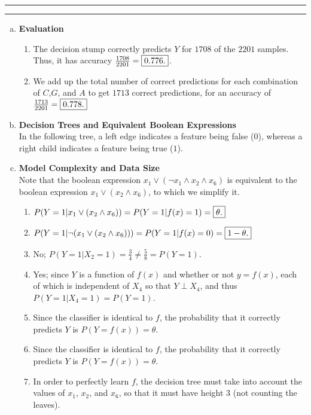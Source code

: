 \documentclass[11pt]{article}
\newcounter{questionCounter}
\newcounter{partCounter}[questionCounter]
\newenvironment{question}[2][\arabic{questionCounter}]{%
    \setcounter{partCounter}{0}%
    \vspace{.25in} \hrule \vspace{0.5em}%
        \noindent{\bf #2}%
    \vspace{0.8em} \hrule \vspace{.10in}%
}{}
\begin{document}
\begin{question}{Decision Trees}
\begin{enumerate}[(a)]
\item {\bf Evaluation} \\
\begin{enumerate}[1.]
\item The decision stump correctly predicts $Y$ for $1708$ of the $2201$ samples.
Thus, it has accuracy $\frac{1708}{2201} = \mbox{\fbox{$0.776$.}}$.

\item We add up the total number of correct predictions for each combination
of $C$,$G$, and $A$ to get $1713$ correct predictions, for an accuracy of $\frac{1713}{2201} = \mbox{\fbox{$0.778$.}}$
\end{enumerate}

\item {\bf Decision Trees and Equivalent Boolean Expressions} \\
In the following tree, a left edge indicates a feature being false ($0$),
whereas a right child indicates a feature being true ($1$).
\vspace{1.5in}

\item {\bf Model Complexity and Data Size} \\
Note that the boolean expression $x_1 \vee (\neg x_1 \wedge x_2 \wedge x_6)$
is equivalent to the boolean expression $x_1 \vee (x_2 \wedge x_6)$,
to which we simplify it.
\begin{enumerate}[1.]
\item $P(Y = 1 | x_1 \vee (x_2 \wedge x_6))
 = P(Y = 1 | f(x) = 1)
 = \mbox{\fbox{$\theta$.}}$

\item $P(Y = 1 | \neg(x_1 \vee (x_2 \wedge x_6)))
 = P(Y = 1 | f(x) = 0)
 = \mbox{\fbox{$1 - \theta$.}}$

\item No; $P(Y = 1 | X_2 = 1) = \frac34 \neq \frac58 = P(Y = 1)$.

\item Yes; since $Y$ is a function of $f(x)$ and whether or not $y = f(x)$,
each of which is independent of $X_4$ so that $Y \perp X_4$, and thus
$P(Y = 1 | X_4 = 1) = P(Y = 1)$.

\item Since the classifier is identical to $f$, the probability that it
correctly predicts $Y$ is $P(Y = f(x)) = \theta$.

\item Since the classifier is identical to $f$, the probability that it
correctly predicts $Y$ is $P(Y = f(x)) = \theta$.

\item In order to perfectly learn $f$, the decision tree must take into
account the values of $x_1$, $x_2$, and $x_6$, so that it must have height $3$
(not counting the leaves).
\end{enumerate}
\end{enumerate}
\end{question}
\end{document}
